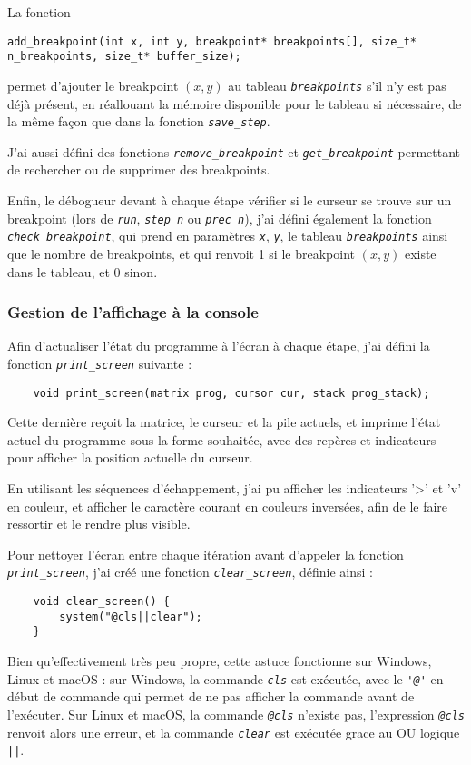 \documentclass[a4paper,11pt]{article}
\newcommand{\code}[1]{{\itshape\lstinline{#1}}}
\begin{document}
\bigskip

La fonction
{\small\begin{lstlisting}
add_breakpoint(int x, int y, breakpoint* breakpoints[], size_t* n_breakpoints, size_t* buffer_size);
\end{lstlisting}}
permet d'ajouter le breakpoint $(x, y)$ au tableau \code{breakpoints} s'il n'y est pas déjà présent, en réallouant la mémoire disponible pour le tableau si nécessaire, de la même façon que dans la fonction \code{save_step}.

J'ai aussi défini des fonctions \code{remove_breakpoint} et \code{get_breakpoint} permettant de rechercher ou de supprimer des breakpoints.

Enfin, le débogueur devant à chaque étape vérifier si le curseur se trouve sur un breakpoint (lors de \code{run}, \code{step n} ou \code{prec n}), j'ai défini également la fonction \code{check_breakpoint}, qui prend en paramètres \code{x}, \code{y}, le tableau \code{breakpoints} ainsi que le nombre de breakpoints, et qui renvoit 1 si le breakpoint $(x, y)$ existe dans le tableau, et 0 sinon.

\subsubsection*{Gestion de l'affichage à la console}
Afin d'actualiser l'état du programme à l'écran à chaque étape, j'ai défini la fonction \code{print_screen} suivante :
{\begin{lstlisting}
    void print_screen(matrix prog, cursor cur, stack prog_stack);
\end{lstlisting}}
Cette dernière reçoit la matrice, le curseur et la pile actuels, et imprime l'état actuel du programme sous la forme souhaitée, avec des repères et indicateurs pour afficher la position actuelle du curseur.

En utilisant les séquences d'échappement, j'ai pu afficher les indicateurs '>' et 'v' en couleur, et afficher le caractère courant en couleurs inversées, afin de le faire ressortir et le rendre plus visible.

\bigskip

Pour nettoyer l'écran entre chaque itération avant d'appeler la fonction \code{print_screen}, j'ai créé une fonction \code{clear_screen}, définie ainsi :
\begin{lstlisting}
    void clear_screen() {
        system("@cls||clear");
    }
\end{lstlisting}
Bien qu'effectivement très peu propre, cette astuce fonctionne sur Windows, Linux et macOS : sur Windows, la commande \code{cls} est exécutée, avec le \code{'@'} en début de commande qui permet de ne pas afficher la commande avant de l'exécuter.
Sur Linux et macOS, la commande \code{@cls} n'existe pas, l'expression \code{@cls} renvoit alors une erreur, et la commande \code{clear} est exécutée grace au OU logique \code{||}.
\end{document}
